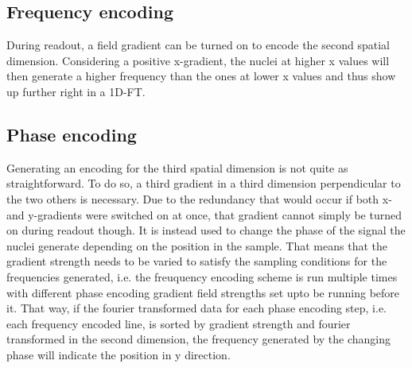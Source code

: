         \subsection{Frequency encoding}
            During readout, a field gradient can be turned on to encode the second spatial
            dimension. Considering a positive x-gradient, the nuclei at higher x values will then
            generate a higher frequency than the ones at lower x values and thus show up further
            right in a 1D-FT.
        \subsection{Phase encoding}
            Generating an encoding for the third spatial dimension is not quite as straightforward.  To do so, a third gradient in a third dimension perpendicular to the two others is necessary.  Due to the redundancy that would occur if both x- and y-gradients were switched on at once, that gradient cannot simply be turned on during readout though.  It is instead used to change the phase of the signal the nuclei generate depending on the position in the sample. That means that the gradient strength needs to be varied to satisfy the sampling conditions for the frequencies generated, i.e. the freuquency encoding scheme is run multiple times with different phase encoding gradient field strengths set upto be running before it. That way, if the fourier transformed data for each phase encoding step, i.e. each frequency encoded line, is sorted by gradient strength and fourier transformed in the second dimension, the frequency generated by the changing phase will indicate the position in y direction.
